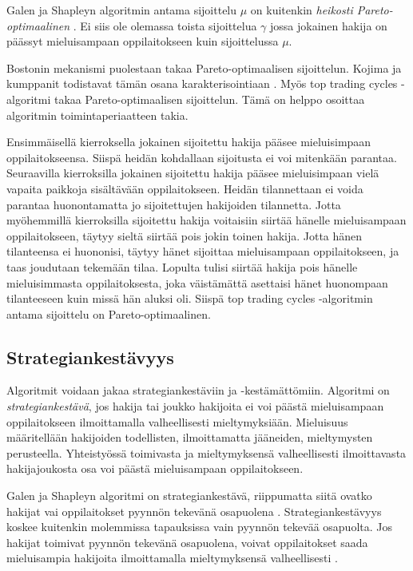 \documentclass[twoside]{tktltiki}
\begin{document}
Galen ja Shapleyn algoritmin antama sijoittelu $\mu$ on kuitenkin
\emph{heikosti Pareto-optimaalinen} \cite{gusfield89}. Ei siis ole
olemassa toista sijoittelua $\gamma$ jossa jokainen hakija on päässyt
mieluisampaan oppilaitokseen kuin sijoittelussa $\mu$.

Bostonin mekanismi puolestaan takaa Pareto-optimaalisen sijoittelun.
Kojima ja kumppanit todistavat tämän osana karakterisointiaan
\cite{kojima10}. Myös top trading cycles -algoritmi takaa
Pareto-optimaalisen sijoittelun. Tämä on helppo osoittaa algoritmin
toimintaperiaatteen takia.

Ensimmäisellä kierroksella jokainen sijoitettu hakija pääsee
mieluisimpaan oppilaitokseensa. Siispä heidän kohdallaan sijoitusta ei
voi mitenkään parantaa. Seuraavilla kierroksilla jokainen sijoitettu
hakija pääsee mieluisimpaan vielä vapaita paikkoja sisältävään
oppilaitokseen. Heidän tilannettaan ei voida parantaa huonontamatta jo
sijoitettujen hakijoiden tilannetta. Jotta myöhemmillä kierroksilla
sijoitettu hakija voitaisiin siirtää hänelle mieluisampaan
oppilaitokseen, täytyy sieltä siirtää pois jokin toinen hakija. Jotta
hänen tilanteensa ei huononisi, täytyy hänet sijoittaa mieluisampaan
oppilaitokseen, ja taas joudutaan tekemään tilaa. Lopulta tulisi
siirtää hakija pois hänelle mieluisimmasta oppilaitoksesta, joka
väistämättä asettaisi hänet huonompaan tilanteeseen kuin missä hän
aluksi oli. Siispä top trading cycles -algoritmin antama sijoittelu on
Pareto-optimaalinen.

\subsection{Strategiankestävyys}

Algoritmit voidaan jakaa strategiankestäviin ja -kestämättömiin.
Algoritmi on \emph{strategiankestävä}, jos hakija tai joukko hakijoita
ei voi päästä mieluisampaan oppilaitokseen ilmoittamalla
valheellisesti mieltymyksiään. Mieluisuus määritellään hakijoiden
todellisten, ilmoittamatta jääneiden, mieltymysten perusteella.
Yhteistyössä toimivasta ja mieltymyksensä valheellisesti ilmoittavasta
hakijajoukosta osa voi päästä mieluisampaan oppilaitokseen.

Galen ja Shapleyn algoritmi on strategiankestävä, riippumatta siitä
ovatko hakijat vai oppilaitokset pyynnön tekevänä osapuolena
\cite{dubins81}. Strategiankestävyys koskee kuitenkin molemmissa
tapauksissa vain pyynnön tekevää osapuolta. Jos hakijat toimivat
pyynnön tekevänä osapuolena, voivat oppilaitokset saada mieluisampia
hakijoita ilmoittamalla mieltymyksensä valheellisesti \cite{dubins81}.
\end{document}
